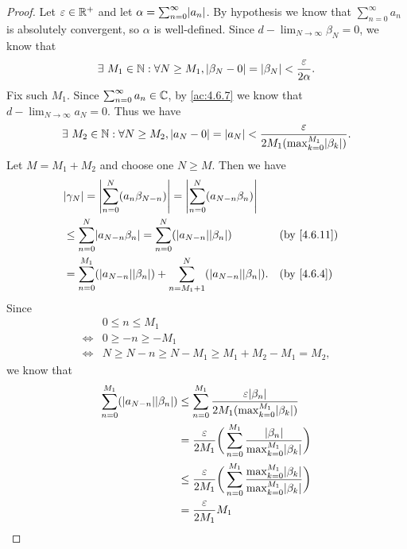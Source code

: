 \begin{proof}
  Let \(\varepsilon \in \mathbb{R}^+\) and let \(\alpha = \sum_{n = 0}^\infty \abs{a_n}\).
  By hypothesis we know that \(\sum_{n = 0}^\infty a_n\) is absolutely convergent, so \(\alpha\) is well-defined.
  Since \(d - \lim_{N \to \infty} \beta_N = 0\), we know that
  \[
    \exists\ M_1 \in \mathbb{N} : \forall N \geq M_1, \left\lvert\beta_N - 0\right\rvert = \left\lvert\beta_N\right\rvert < \dfrac{\varepsilon}{2 \alpha}.
  \]
  Fix such \(M_1\).
  Since \(\sum_{n = 0}^\infty a_n \in \mathbb{C}\), by \cref{ac:4.6.7} we know that \(d - \lim_{N \to \infty} a_N = 0\).
  Thus we have
  \[
    \exists\ M_2 \in \N : \forall N \geq M_2, \abs{a_N - 0} = \abs{a_N} < \dfrac{\varepsilon}{2 M_1 (\max_{k = 0}^{M_1} \abs{\beta_k})}.
  \]
  Let \(M = M_1 + M_2\) and choose one \(N \geq M\).
  Then we have
  \begin{align*}
     & \abs{\gamma_N} = \abs{\sum_{n = 0}^N (a_n \beta_{N - n})} = \abs{\sum_{n = 0}^N (a_{N - n} \beta_n)}                                        \\
     & \leq \sum_{n = 0}^N \abs{a_{N - n} \beta_n} = \sum_{n = 0}^N (\abs{a_{N - n}} \abs{\beta_n})                 &  & \text{(by \cref{4.6.11})} \\
     & = \sum_{n = 0}^{M_1} (\abs{a_{N - n}} \abs{\beta_n}) + \sum_{n = M_1 + 1}^N (\abs{a_{N - n}} \abs{\beta_n}). &  & \text{(by \cref{4.6.4})}
  \end{align*}
  Since
  \begin{align*}
         & 0 \leq n \leq M_1                                     \\
    \iff & 0 \geq -n \geq -M_1                                   \\
    \iff & N \geq N - n \geq N - M_1 \geq M_1 + M_2 - M_1 = M_2,
  \end{align*}
  we know that
  \begin{align*}
    \sum_{n = 0}^{M_1} (\abs{a_{N - n}} \abs{\beta_n}) & \leq \sum_{n = 0}^{M_1} \dfrac{\varepsilon \abs{\beta_n}}{2 M_1 (\max_{k = 0}^{M_1} \abs{\beta_k})}                                       \\
                                                       & = \dfrac{\varepsilon}{2 M_1} \bigg(\sum_{n = 0}^{M_1} \dfrac{\abs{\beta_n}}{\max_{k = 0}^{M_1} \abs{\beta_k}}\bigg)                       \\
                                                       & \leq \dfrac{\varepsilon}{2 M_1} \bigg(\sum_{n = 0}^{M_1} \dfrac{\max_{k = 0}^{M_1} \abs{\beta_k}}{\max_{k = 0}^{M_1} \abs{\beta_k}}\bigg) \\
                                                       & = \dfrac{\varepsilon}{2 M_1} M_1                                                                                                          \\

\end{align*}
\end{proof}

